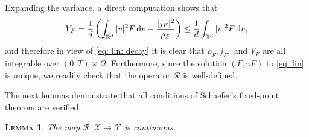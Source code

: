 \documentclass[10pt, reqno]{amsart}
\theoremstyle{plain}
\newtheorem{lemma}[theorem]{\normalfont \scshape Lemma}
\theoremstyle{definition}
\theoremstyle{remark}
\numberwithin{equation}{section}
\newcommand{\scrR}{\mathscr R}
\newcommand{\scrX}{\mathscr X}
\newcommand{\R}{\mathbb{R}}
\newcommand{\dv}{\textnormal{d}v}
\newcommand{\lt}{\left}
\newcommand{\rt}{\right}
\newcommand{\intr}{\int_{\R^d}}
\begin{document}
Expanding the variance, a direct computation shows that
\begin{align}\label{eq: variance and second moment}
    V_F = \frac{1}{d}\lt( \intr |v|^2 F\,\dv - \frac{|j_F|^2}{\rho_F} \rt) \le \frac{1}{d} \intr |v|^2 F \,\dv,
\end{align}
and therefore in view of \eqref{eq: lin: decay} it is clear that $\rho_F, j_F,$ and $V_F$ are all integrable over $(0,T)\times\Omega$. Furthermore, since the solution $(F,\gamma F)$ to \eqref{eq: lin} is unique, we readily check that the operator $\scrR$ is well-defined.

The next lemmas demonstrate that all conditions of Schaefer's fixed-point theorem are verified.

\begin{lemma} \label{lem: R continuous}
    The map $\mathscr{R}: \scrX\to \scrX$ is continuous.
\end{lemma}
\end{document}
